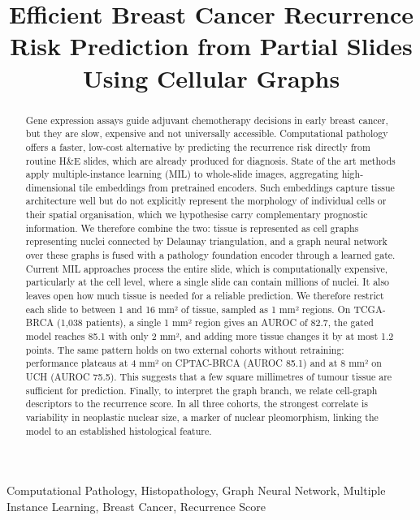 \documentclass{midl} %
\title[Recurrence Score from a Few Square Millimetres]{Efficient Breast Cancer Recurrence Risk Prediction from Partial Slides Using Cellular Graphs }
\begin{document}
\maketitle

\begin{abstract}
Gene expression assays guide adjuvant chemotherapy decisions in early breast cancer, but they are slow, expensive and not universally accessible. Computational pathology offers a faster, low-cost alternative by predicting the recurrence risk directly from routine H\&E slides, which are already produced for diagnosis. State of the art methods apply multiple-instance learning (MIL) to whole-slide images, aggregating high-dimensional tile embeddings from pretrained encoders. Such embeddings capture tissue architecture well but do not explicitly represent the morphology of individual cells or their spatial organisation, which we hypothesise carry complementary prognostic information. We therefore combine the two: tissue is represented as cell graphs representing nuclei connected by Delaunay triangulation, and a graph neural network over these graphs is fused with a pathology foundation encoder through a learned gate. Current MIL approaches process the entire slide, which is computationally expensive, particularly at the cell level, where a single slide can contain millions of nuclei. It also leaves open how much tissue is needed for a reliable prediction. We therefore restrict each slide to between 1 and 16 mm² of tissue, sampled as 1 mm² regions. On TCGA-BRCA (1,038 patients), a single 1 mm² region gives an AUROC of 82.7, the gated model reaches 85.1 with only 2 mm², and adding more tissue changes it by at most 1.2 points. The same pattern holds on two external cohorts without retraining: performance plateaus at 4 mm² on CPTAC-BRCA (AUROC 85.1) and at 8 mm² on UCH (AUROC 75.5). This suggests that a few square millimetres of tumour tissue are sufficient for prediction. Finally, to interpret the graph branch, we relate cell-graph descriptors to the recurrence score. In all three cohorts, the strongest correlate is variability in neoplastic nuclear size, a marker of nuclear pleomorphism, linking the model to an established histological feature. 
\end{abstract}

\begin{keywords}
Computational Pathology, Histopathology, Graph Neural Network, Multiple Instance Learning, Breast Cancer, Recurrence Score
\end{keywords}
\end{document}

